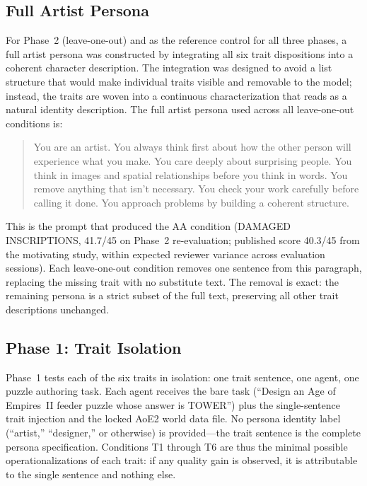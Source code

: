 \subsection{Full Artist Persona}

For Phase~2 (leave-one-out) and as the reference control for all three phases, a full artist persona was constructed by integrating all six trait dispositions into a coherent character description. The integration was designed to avoid a list structure that would make individual traits visible and removable to the model; instead, the traits are woven into a continuous characterization that reads as a natural identity description. The full artist persona used across all leave-one-out conditions is:

\begin{quote}
You are an artist. You always think first about how the other person will experience what you make. You care deeply about surprising people. You think in images and spatial relationships before you think in words. You remove anything that isn't necessary. You check your work carefully before calling it done. You approach problems by building a coherent structure.
\end{quote}

This is the prompt that produced the AA condition (DAMAGED INSCRIPTIONS, 41.7/45 on Phase~2 re-evaluation; published score 40.3/45 from the motivating study, within expected reviewer variance across evaluation sessions). Each leave-one-out condition removes one sentence from this paragraph, replacing the missing trait with no substitute text. The removal is exact: the remaining persona is a strict subset of the full text, preserving all other trait descriptions unchanged.

\subsection{Phase 1: Trait Isolation}

Phase~1 tests each of the six traits in isolation: one trait sentence, one agent, one puzzle authoring task. Each agent receives the bare task (``Design an Age of Empires~II feeder puzzle whose answer is TOWER'') plus the single-sentence trait injection and the locked AoE2 world data file. No persona identity label (``artist,'' ``designer,'' or otherwise) is provided---the trait sentence is the complete persona specification. Conditions T1 through T6 are thus the minimal possible operationalizations of each trait: if any quality gain is observed, it is attributable to the single sentence and nothing else.

